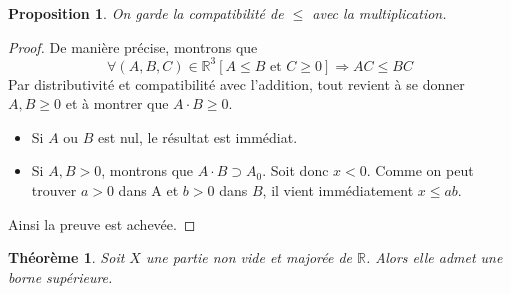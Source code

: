 \documentclass[french]{book}
\newcommand{\R}{\mathbb{R}}
\theoremstyle{plain}
\newtheorem{thm}{Théorème}[chapter]
\newtheorem{prop}{Proposition}[chapter]
\theoremstyle{definition}
\theoremstyle{remark}
\begin{document}
\begin{prop}
	On garde la compatibilité de $\leqslant$ avec la multiplication.
\end{prop}
\begin{proof}
	De manière précise, montrons que $$\forall(A,B,C)\in\mathbb{R}^{3} [A\le B \text{ et } C\ge0] \Rightarrow AC\le BC$$ Par distributivité et compatibilité avec l'addition, tout revient à se donner $A,B\ge0$ et à montrer que $A \cdot B\ge0$.
	\begin{itemize}
		\item Si $A$ ou $B$ est nul, le résultat est immédiat.
		\item Si $A,B>0$, montrons que $A \cdot B\supset A_{0}$. Soit donc $x<0$. Comme on peut trouver $a>0$ dans A et $b>0$ dans $B$, il vient immédiatement $x\le ab$.
	\end{itemize}
	Ainsi la preuve est achevée.
\end{proof}
\begin{thm}
	Soit $X$ une partie non vide et majorée de $\R$. Alors elle admet une borne supérieure.
\end{thm}
\end{document}
